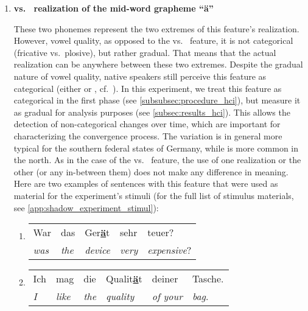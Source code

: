 \begin{enumerate}
	\item \textbf{\textipa{[e:]} vs.\ \textipa{[E:]} realization of the mid-word grapheme \enquote{ä}}
	
	These two phonemes represent the two extremes of this feature's realization.
	However, vowel quality, as opposed to the \textipa{[\c{c}]} vs.\ \textipa{[k]} feature, it is not categorical (fricative vs.\ plosive), but rather gradual.
	That means that the actual realization can be anywhere between these two extremes.
	Despite the gradual nature of vowel quality, native speakers still perceive this feature as categorical (either \textipa{[e]} or \textipa{[E]}, cf.\ \citet{Kuhl2004early, Kuhl1991human}).
	In this experiment, we treat this feature as categorical in the first phase (see \cref{subsubsec:procedure_hci}), but measure it as gradual for analysis purposes (see \cref{subsec:results_hci}).
	This allows the detection of non-categorical changes over time, which are important for characterizing the convergence process.
	The \textipa{[E]} variation is in general more typical for the southern federal states of Germany, while \textipa{[e]} is more common in the north.
	As in the case of the \textipa{[\c{c}]} vs.\ \textipa{[k]} feature, the use of one realization or the other (or any in-between them) does not make any difference in meaning.
	Here are two examples of sentences with this feature that were used as material for the experiment's stimuli (for the full list of stimulus materials, see \autoref{app:shadow_experiment_stimul}):
	
	\begin{enumerate}[label=\arabic{enumi}\alph*), ref=\arabic{enumi}\alph*.)]
		\item 
		\begin{tabulary}{\linewidth}{LLLLL}
			War 		 & das 			& Ger\textbf{\underline{ä}}t & sehr			 & teuer?\\
			\textit{was} & \textit{the} & \textit{device}			 & \textit{very} & \textit{expensive}?\\
		\end{tabulary}
		\item
		\begin{tabulary}{\linewidth}{LLLLLL}
			Ich		   & mag 			& die 			& Qualit\textbf{\underline{ä}}t & deiner		   & Tasche.\\
			\textit{I} & \textit{like}  & \textit{the}  & \textit{quality} 				& \textit{of your} & \textit{bag}.\\
		\end{tabulary}
	\end{enumerate}
	

\end{enumerate}
